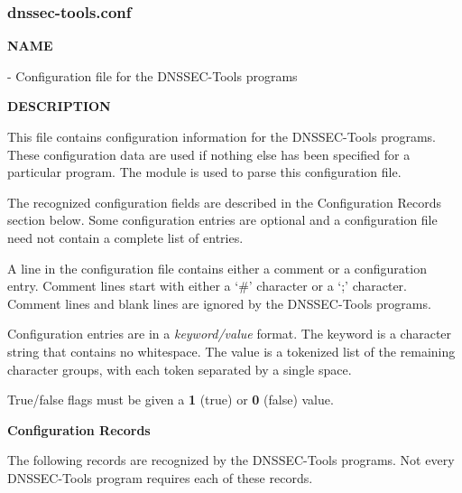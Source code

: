 \clearpage

\subsubsection{dnssec-tools.conf}

{\bf NAME}

 - Configuration file for the DNSSEC-Tools programs

{\bf DESCRIPTION}

This file contains configuration information for the DNSSEC-Tools programs.
These configuration data are used if nothing else has been specified for a
particular program.  The  module is used to parse this
configuration file.

The recognized configuration fields are described in the Configuration Records
section below.  Some configuration entries are optional and a configuration
file need not contain a complete list of entries.

A line in the configuration file contains either a comment or a configuration
entry.  Comment lines start with either a `\#' character or a `;' character.
Comment lines and blank lines are ignored by the DNSSEC-Tools programs.

Configuration entries are in a {\it keyword/value} format.  The keyword is a
character string that contains no whitespace.  The value is a tokenized list
of the remaining character groups, with each token separated by a single space.

True/false flags must be given a {\bf 1} (true) or {\bf 0} (false) value.

{\bf Configuration Records}

The following records are recognized by the DNSSEC-Tools programs.
Not every DNSSEC-Tools program requires each of these records.

